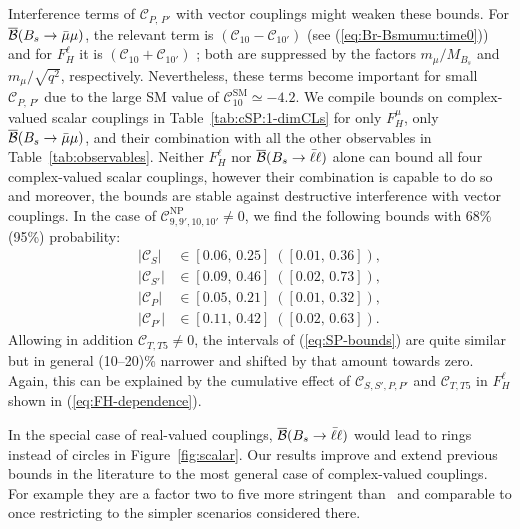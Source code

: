 \documentclass[twocolumn,epjc3]{svjour3}
\numberwithin{equation}{section}
\def \refeq#1{(\ref{#1})}
\def \reffig#1{Figure~\ref{#1}}
\def \reftab#1{Table~\ref{#1}}
\newcommand{\wilson}[2][{}]{\mathcal{C}_{#2}^{\mathrm{#1}}}
\renewcommand{\[}{\big[}
\renewcommand{\]}{\big]}
\renewcommand{\(}{\big(}
\renewcommand{\)}{\big)}
\begin{document}
Interference terms of $\wilson{P,\,P'}$ with vector couplings might weaken these
bounds. For $\overline{\cal B}(B_s \to \bar\mu\mu)$, the relevant term is
$(\wilson{10} - \wilson{10'})$ (see \refeq{eq:Br-Bsmumu:time0}) and for
$F_H^\ell$ it is $(\wilson{10} + \wilson{10'})$ \cite{Bobeth:2007dw}; both are
suppressed by the factors $m_\mu/M_{B_s}$ and $m_\mu/\sqrt{q^2}$,
respectively. Nevertheless, these terms become important for small
$\wilson{P,\,P'}$ due to the large SM value of $\wilson[SM]{10} \simeq -4.2$. We
compile bounds on complex-valued scalar couplings in \reftab{tab:cSP:1-dimCLs}
for only $F_H^\mu$, only $\overline{\cal B}(B_s \to \bar\mu\mu)$, and their
combination with all the other observables in \reftab{tab:observables}. Neither
$F_H^\ell$ nor $\overline{\cal B}(B_s \to \bar\ell\ell)$ alone can bound all
four complex-valued scalar couplings, however their combination is capable to do
so and moreover, the bounds are stable against destructive interference with
vector couplings. In the case of $\wilson[NP]{9,9',10,10'} \ne 0$, we find the
following bounds with 68\% (95\%) probability:
\begin{equation}
  \label{eq:SP-bounds}
  \begin{aligned}
    \left| \wilson{S} \right| & \in [0.06,\, 0.25]\; ([0.01,\, 0.36]),\\
    \left| \wilson{S'} \right| & \in [0.09,\, 0.46]\; ([0.02,\, 0.73]),\\
    \left| \wilson{P} \right| & \in [0.05,\, 0.21]\; ([0.01,\, 0.32]),\\
    \left| \wilson{P'} \right| & \in [0.11,\, 0.42]\; ([0.02,\, 0.63]).
  \end{aligned}
\end{equation}
Allowing in addition $\wilson{T,T5} \ne 0$, the intervals of
\refeq{eq:SP-bounds} are quite similar but in general (10--20)\% narrower and
shifted by that amount towards zero. Again, this can be explained by the
cumulative effect of $\wilson{S,S',P,P'}$ and $\wilson{T,T5}$ in $F_H^\ell$
shown in \refeq{eq:FH-dependence}.

In the special case of real-valued couplings, $\overline{\cal B}(B_s \to
\bar\ell\ell)$ would lead to rings~\cite{Alonso:2014csa} instead of circles in \reffig{fig:scalar}.
Our results improve and extend previous bounds in the literature to the most
general case of complex-valued couplings. For example they are a factor two to
five more stringent than~\cite{Becirevic:2012fy} and comparable to
\cite{Altmannshofer:2012az} once restricting to the simpler scenarios considered
there.
%
%
\end{document}
